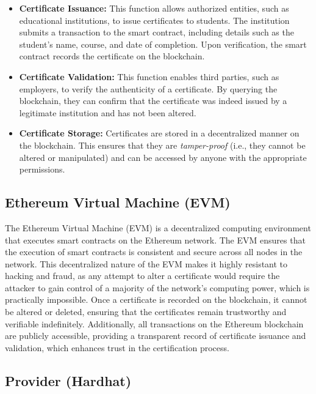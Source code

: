 \begin{itemize}
    \item \textbf{Certificate Issuance:} This function allows authorized entities, such as educational institutions, to issue certificates to students. The institution submits a transaction to the smart contract, including details such as the student’s name, course, and date of completion. Upon verification, the smart contract records the certificate on the blockchain.

    \item \textbf{Certificate Validation:} This function enables third parties, such as employers, to verify the authenticity of a certificate. By querying the blockchain, they can confirm that the certificate was indeed issued by a legitimate institution and has not been altered.

    \item \textbf{Certificate Storage:} Certificates are stored in a decentralized manner on the blockchain. This ensures that they are \textit{tamper-proof} (i.e., they cannot be altered or manipulated) and can be accessed by anyone with the appropriate permissions.

\end{itemize}

\subsection{Ethereum Virtual Machine (EVM)}

The Ethereum Virtual Machine (EVM) is a decentralized computing environment that executes smart contracts on the Ethereum network. The EVM ensures that the execution of smart contracts is consistent and secure across all nodes in the network\cite{EVM}. This decentralized nature of the EVM makes it highly resistant to hacking and fraud, as any attempt to alter a certificate would require the attacker to gain control of a majority of the network’s computing power, which is practically impossible. Once a certificate is recorded on the blockchain, it cannot be altered or deleted, ensuring that the certificates remain trustworthy and verifiable indefinitely. Additionally, all transactions on the Ethereum blockchain are publicly accessible, providing a transparent record of certificate issuance and validation, which enhances trust in the certification process.

\subsection{Provider (Hardhat)}

